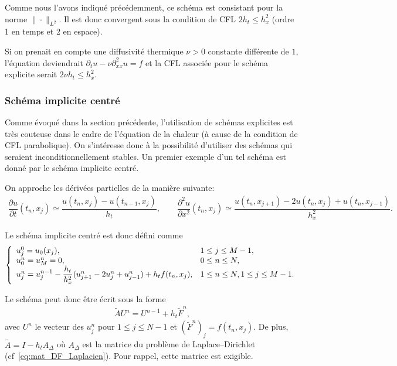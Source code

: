 \documentclass[12pt,a4paper,twoside]{article}
\begin{document}
Comme nous l'avons indiqu\'e pr\'ec\'edemment, ce sch\'ema est consistant pour la norme
$\| \cdot \|_{L^2}$. Il est donc convergent sous la condition de CFL $2 h_t \leq h_x^2$
(ordre 1 en temps et 2 en espace).

\begin{remark}
  Si on prenait en compte une diffusivit\'e thermique $\nu > 0$
  constante diff\'erente de $1$, l'\'equation
  deviendrait $\partial_t u - \nu \partial_{xx}^2 u = f$
  et la CFL associ\'ee pour le sch\'ema explicite serait
  $2 \nu h_t \leq h_x^2$.
\end{remark}

\subsubsection{Sch\'ema implicite centr\'e}
\label{subsubsec:chaleur_DF_implicite}


Comme \'evoqu\'e dans la section pr\'ec\'edente, l'utilisation de sch\'emas
explicites est tr\`es couteuse dans le cadre de l'\'equation de la chaleur
(\`a cause de la condition de CFL parabolique).
On s'int\'eresse donc \`a la possibilit\'e d'utiliser des sch\'emas
qui seraient inconditionnellement stables.
Un premier exemple d'un tel sch\'ema est donn\'e par le sch\'ema 
implicite centr\'e.


On approche les d\'eriv\'ees partielles de la mani\`ere suivante:
\begin{align*}
  \dfrac{\partial u}{\partial t}(t_n,x_j) \simeq \dfrac{u(t_{n},x_j) - u(t_{n-1},x_j)}{h_t} ,
  \qquad 
  \dfrac{\partial^2 u}{\partial x^2}(t_n,x_j) 
  \simeq \dfrac{u(t_{n},x_{j+1}) - 2 u(t_n,x_j) + u(t_n,x_{j-1})}{h_x^2} .
\end{align*}




Le sch\'ema implicite centr\'e est donc d\'efini comme
\begin{align}
  \label{eq:chaleur_DF_imp_centre}
  \left\{
  \begin{array}{l l}
    u_j^0 = u_0(x_j) ,
    &1 \leq j \leq M-1,
    \\
    u_0^n = u_M^n = 0 ,
    &    0 \leq n \leq N, 
    \\
    u_j^{n} = u_j^{n-1} - \dfrac{h_t}{h_x^2} (u_{j+1}^{n} - 2 u_{j}^{n} + u_{j-1}^{n} ) 
    + h_t f(t_n,x_j) ,
    & 1 \leq n \leq N, 1 \leq j \leq M-1 .
  \end{array}
  \right.
\end{align}

Le sch\'ema peut donc \^etre \'ecrit sous la forme
\begin{align*}
  \widetilde{A} U^n = U^{n-1} + h_t \widetilde{F}^n ,
\end{align*}
avec $U^n$ le vecteur des $u_j^n$ pour $1 \leq j \leq N-1$ et $(\widetilde{F}^n)_j = f(t_n,x_j)$. 
De plus, $\widetilde{A} = I - h_t A_{\Delta}$ o\`u $A_{\Delta}$ est la matrice
du probl\`eme de Laplace--Dirichlet (cf~\eqref{eq:mat_DF_Laplacien}).
Pour rappel, cette matrice est exigible.
\end{document}
